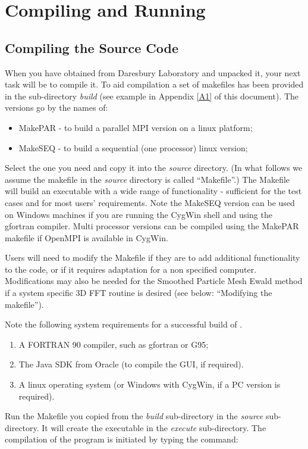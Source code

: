 \section{Compiling and Running \D{}}

\subsection{Compiling the Source Code}
\label{compile}

When you have obtained \D{} from Daresbury Laboratory and unpacked it,
your next task will be to compile it.  To aid compilation a set of
makefiles  has been provided in the
sub-directory {\em build} (see example in Appendix \ref{A1} of this
document). The versions go by the names of: 
\begin{itemize}
\item MakePAR - to build a parallel MPI version on a linux platform;
\item MakeSEQ - to build a sequential (one processor) linux version;
\end{itemize}
Select the one you need and copy it into the {\em source}
directory. (In what follows we assume the makefile in the {\em source}
directory is called ``Makefile''.) The Makefile will build an executable
with a wide range of functionality - sufficient for the test cases and
for most users' requirements.  Note the MakeSEQ version can be used on
Windows machines if you are running the CygWin shell and using the
gfortran compiler. Multi processor versions can be compiled using the
MakePAR makefile if OpenMPI is available in CygWin.

Users will need to modify the Makefile if they are to add additional
functionality to the code, or if it requires adaptation for a non
specified computer. Modifications may also be needed for the Smoothed
Particle Mesh Ewald method if a system specific 3D FFT routine is
desired (see below: ``Modifying the makefile'').

Note the following system requirements for a successful build of \D{}.
\begin{enumerate}
\item A FORTRAN 90 compiler, such as gfortran or G95;
\item The Java SDK from Oracle (to compile the GUI, if required).
\item A linux operating system (or Windows with CygWin, if a PC 
version is required).
\end{enumerate}

Run the Makefile you copied from the {\em build} sub-directory in the
{\em source} sub-directory. It will create the executable in the {\em
execute} sub-directory. The compilation of the program is initiated by
typing the command: \\~\\

